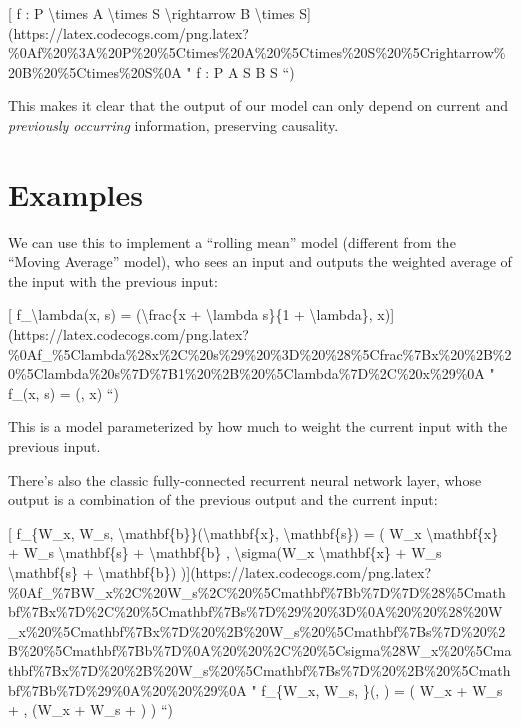 \documentclass[]{article}
\begin{document}
{[} f : P \textbackslash{}times A \textbackslash{}times S
\textbackslash{}rightarrow B \textbackslash{}times
S{]}(https://latex.codecogs.com/png.latex?\%0Af\%20\%3A\%20P\%20\%5Ctimes\%20A\%20\%5Ctimes\%20S\%20\%5Crightarrow\%20B\%20\%5Ctimes\%20S\%0A
" f : P \times A \times S \rightarrow B \times S ``)

This makes it clear that the output of our model can only depend on current and
\emph{previously occurring} information, preserving causality.

\hypertarget{examples}{%
\section{Examples}\label{examples}}

We can use this to implement a ``rolling mean'' model (different from the
``Moving Average'' model), who sees an input and outputs the weighted average of
the input with the previous input:

{[} f\_\textbackslash{}lambda(x, s) = (\textbackslash{}frac\{x +
\textbackslash{}lambda s\}\{1 + \textbackslash{}lambda\},
x){]}(https://latex.codecogs.com/png.latex?\%0Af\_\%5Clambda\%28x\%2C\%20s\%29\%20\%3D\%20\%28\%5Cfrac\%7Bx\%20\%2B\%20\%5Clambda\%20s\%7D\%7B1\%20\%2B\%20\%5Clambda\%7D\%2C\%20x\%29\%0A
" f\_\lambda(x, s) = (, x) ``)

This is a model parameterized by how much to weight the current input with the
previous input.

There's also the classic fully-connected recurrent neural network layer, whose
output is a combination of the previous output and the current input:

{[} f\_\{W\_x, W\_s, \textbackslash{}mathbf\{b\}\}(\textbackslash{}mathbf\{x\},
\textbackslash{}mathbf\{s\}) = ( W\_x \textbackslash{}mathbf\{x\} + W\_s
\textbackslash{}mathbf\{s\} + \textbackslash{}mathbf\{b\} ,
\textbackslash{}sigma(W\_x \textbackslash{}mathbf\{x\} + W\_s
\textbackslash{}mathbf\{s\} + \textbackslash{}mathbf\{b\})
){]}(https://latex.codecogs.com/png.latex?\%0Af\_\%7BW\_x\%2C\%20W\_s\%2C\%20\%5Cmathbf\%7Bb\%7D\%7D\%28\%5Cmathbf\%7Bx\%7D\%2C\%20\%5Cmathbf\%7Bs\%7D\%29\%20\%3D\%0A\%20\%20\%28\%20W\_x\%20\%5Cmathbf\%7Bx\%7D\%20\%2B\%20W\_s\%20\%5Cmathbf\%7Bs\%7D\%20\%2B\%20\%5Cmathbf\%7Bb\%7D\%0A\%20\%20\%2C\%20\%5Csigma\%28W\_x\%20\%5Cmathbf\%7Bx\%7D\%20\%2B\%20W\_s\%20\%5Cmathbf\%7Bs\%7D\%20\%2B\%20\%5Cmathbf\%7Bb\%7D\%29\%0A\%20\%20\%29\%0A
" f\_\{W\_x, W\_s, \}(, ) = ( W\_x  +
W\_s  +  , \sigma(W\_x  + W\_s  +
) ) ``)
\end{document}
